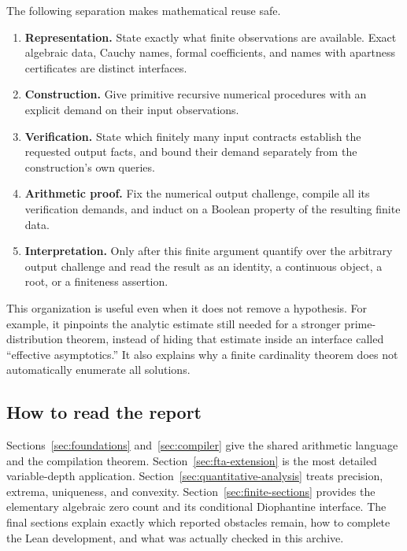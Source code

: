 The following separation makes mathematical reuse safe.
\begin{enumerate}
\item \textbf{Representation.} State exactly what finite observations
      are available. Exact algebraic data, Cauchy names, formal
      coefficients, and names with apartness certificates are distinct
      interfaces.
\item \textbf{Construction.} Give primitive recursive numerical
      procedures with an explicit demand on their input observations.
\item \textbf{Verification.} State which finitely many input contracts
      establish the requested output facts, and bound their demand
      separately from the construction's own queries.
\item \textbf{Arithmetic proof.} Fix the numerical output challenge,
      compile all its verification demands, and induct on a Boolean
      property of the resulting finite data.
\item \textbf{Interpretation.} Only after this finite argument quantify
      over the arbitrary output challenge and read the result as an
      identity, a continuous object, a root, or a finiteness assertion.
\end{enumerate}

This organization is useful even when it does not remove a hypothesis.
For example, it pinpoints the analytic estimate still needed for a
stronger prime-distribution theorem, instead of hiding that estimate
inside an interface called ``effective asymptotics.'' It also explains
why a finite cardinality theorem does not automatically enumerate all
solutions.

\subsection{How to read the report}

Sections~\ref{sec:foundations} and~\ref{sec:compiler} give the shared
arithmetic language and the compilation theorem.
Section~\ref{sec:fta-extension} is the most detailed variable-depth
application. Section~\ref{sec:quantitative-analysis} treats precision,
extrema, uniqueness, and convexity. Section~\ref{sec:finite-sections}
provides the elementary algebraic zero count and its conditional
Diophantine interface. The final sections explain exactly which reported
obstacles remain, how to complete the Lean development, and what was
actually checked in this archive.
